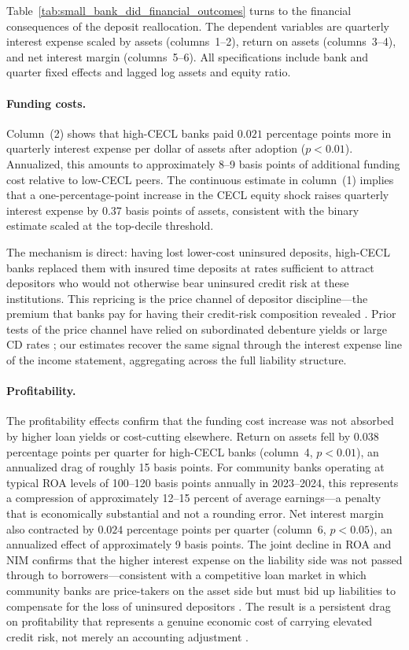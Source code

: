 Table~\ref{tab:small_bank_did_financial_outcomes} turns to the financial
consequences of the deposit reallocation.  The dependent variables are quarterly
interest expense scaled by assets (columns~1--2), return on assets
(columns~3--4), and net interest margin (columns~5--6).  All specifications
include bank and quarter fixed effects and lagged log assets and equity ratio.

\paragraph{Funding costs.}
Column~(2) shows that high-CECL banks paid $0.021$ percentage points more in
quarterly interest expense per dollar of assets after adoption ($p < 0.01$).
Annualized, this amounts to approximately 8--9 basis points of additional funding
cost relative to low-CECL peers.  The continuous estimate in column~(1) implies
that a one-percentage-point increase in the CECL equity shock raises quarterly
interest expense by 0.37 basis points of assets, consistent with the binary
estimate scaled at the top-decile threshold.

The mechanism is direct: having lost lower-cost uninsured deposits, high-CECL
banks replaced them with insured time deposits at rates sufficient to attract
depositors who would not otherwise bear uninsured credit risk at these
institutions.  This repricing is the price channel of depositor discipline---the
premium that banks pay for having their credit-risk composition revealed
\citep{nier2006market, billett1998cost}.  Prior tests of the price channel have
relied on subordinated debenture yields \citep{flannery1996evidence} or large
CD rates \citep{hannan1988bank, ellis1992does}; our estimates recover the same
signal through the interest expense line of the income statement, aggregating
across the full liability structure.

\paragraph{Profitability.}
The profitability effects confirm that the funding cost increase was not absorbed
by higher loan yields or cost-cutting elsewhere.  Return on assets fell by $0.038$
percentage points per quarter for high-CECL banks (column~4, $p < 0.01$), an
annualized drag of roughly 15 basis points.  For community banks operating at
typical ROA levels of 100--120 basis points annually in 2023--2024, this
represents a compression of approximately 12--15 percent of average earnings---a
penalty that is economically substantial and not a rounding error.  Net interest
margin also contracted by $0.024$ percentage points per quarter (column~6,
$p < 0.05$), an annualized effect of approximately 9 basis points.  The joint
decline in ROA and NIM confirms that the higher interest expense on the liability
side was not passed through to borrowers---consistent with a competitive loan
market in which community banks are price-takers on the asset side but must bid
up liabilities to compensate for the loss of uninsured depositors
\citep{drechsler2017deposits}.  The result is a persistent drag on profitability
that represents a genuine economic cost of carrying elevated credit risk, not
merely an accounting adjustment \citep{bushman2012accounting}.

